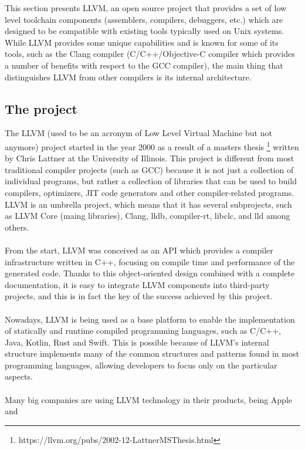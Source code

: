 \documentclass[12pt,a4paper,oneside]{article}
\begin{document}
This section presents LLVM, an open source project that provides a set of
low level toolchain components (assemblers, compilers, debuggers, etc.) which
are designed to be compatible with existing tools typically used on Unix
systems. While LLVM provides some unique capabilities and is known for some of
its tools, such as the Clang compiler (C/C++/Objective-C compiler which provides
a number of benefits with respect to the GCC compiler), the main thing that
distinguishes LLVM from other compilers is its internal architecture.

\subsection{The project}

The LLVM (used to be an acronym of Low Level Virtual Machine but not anymore)
project started in the year 2000 as a result of a masters thesis
\footnote{https://llvm.org/pubs/2002-12-LattnerMSThesis.html} written by Chris
Lattner at the University of Illinois. This project is different from most
traditional compiler projects (such as GCC) because it is not just a
collection of individual programs, but rather a collection of libraries that
can be used to build compilers, optimizers, JIT code generators and other
compiler-related programs. LLVM is an umbrella project, which means that it has
several subprojects, such as LLVM Core (maing libraries), Clang, lldb, compiler-rt,
libclc, and lld among others.\\\\
From the start, LLVM was conceived as an API which provides a compiler
infrastructure written in C++, focusing on compile time and performance
of the generated code. Thanks to this object-oriented design combined with a
complete documentation, it is easy to integrate LLVM components into third-party
projects, and this is in fact the key of the success achieved by this project.\\\\
Nowadays, LLVM is being used as a base platform to enable the implementation of
statically and runtime compiled programming languages, such as C/C++, Java,
Kotlin, Rust and Swift. This is possible because of LLVM's internal structure
implements many of the common structures and patterns found in most programming
languages, allowing developers to focus only on the particular aspects.\\\\
Many big companies are using LLVM technology in their products, being Apple and
\end{document}
